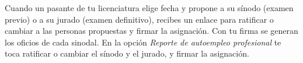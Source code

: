 \documentclass[11pt,a4paper]{article}
\begin{document}
{\small\tableofcontents}
\newpage
\begin{quevasahacer}
Cuando un pasante de tu licenciatura elige fecha y propone a su sínodo (examen previo) o a su jurado (examen definitivo), recibes un enlace para ratificar o cambiar a las personas propuestas y firmar la asignación. Con tu firma se generan los oficios de cada sinodal. En la opción \emph{Reporte de autoempleo profesional} te toca ratificar o cambiar el sínodo y el jurado, y firmar la asignación.
\end{quevasahacer}



\end{document}
